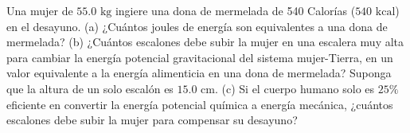\item Una mujer de $55.0 \text{ kg}$ ingiere una dona de mermelada de 540 Calorías ($540 \text{ kcal}$) en el desayuno. (a) ¿Cuántos joules de energía son equivalentes a una dona de mermelada? (b) ¿Cuántos escalones debe subir la mujer en una escalera muy alta para cambiar la energía potencial gravitacional del sistema mujer-Tierra, en un valor equivalente a la energía alimenticia en una dona de mermelada? Suponga que la altura de un solo escalón es $15.0 \text{ cm}$. (c) Si el cuerpo humano solo es $25\%$ eficiente en convertir la energía potencial química a energía mecánica, ¿cuántos escalones debe subir la mujer para compensar su desayuno?
